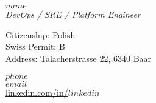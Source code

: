 \documentclass[$fontsize$, a4paper]{article}
\begin{document}

{\LARGE $name$}\\[.2cm]
{\large \textsl{DevOps / SRE / Platform Engineer}}\\[.1cm]

\begin{multicols}{2}


Citizenship: Polish\\
Swiss Permit: B\\
Address: Talacherstrasse 22, 6340 Baar

\columnbreak

$phone$\\
\href{mailto:$email$}{$email$}\\
\href{http://linkedin.com/in/$linkedin$}{linkedin.com/in/$linkedin$}\\

\end{multicols}











\end{document}
